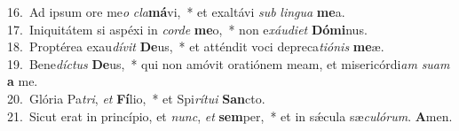 {16.~}Ad ipsum ore me\textit{o} \textit{cla}\textbf{má}vi,~* et exaltávi \textit{sub} \textit{lin}\textit{gua} \textbf{me}a.\\
{17.~}Iniquitátem si aspéxi in \textit{cor}\textit{de} \textbf{me}o,~* non e\textit{xáu}\textit{di}\textit{et} \textbf{Dó}\textbf{mi}nus.\\
{18.~}Proptérea exau\textit{dí}\textit{vit} \textbf{De}us,~* et atténdit voci depreca\textit{ti}\textit{ó}\textit{nis} \textbf{me}æ.\\
{19.~}Bene\textit{dí}\textit{ctus} \textbf{De}us,~* qui non amóvit oratiónem meam, et misericórdi\textit{am} \textit{su}\textit{am} \textbf{a} me.\\
{20.~}Glória Pa\textit{tri}, \textit{et} \textbf{Fí}lio,~* et Spi\textit{rí}\textit{tu}\textit{i} \textbf{San}cto.\\
{21.~}Sicut erat in princípio, et \textit{nunc}, \textit{et} \textbf{sem}per,~* et in sǽcula sæ\textit{cu}\textit{ló}\textit{rum}. \textbf{A}men.\\
